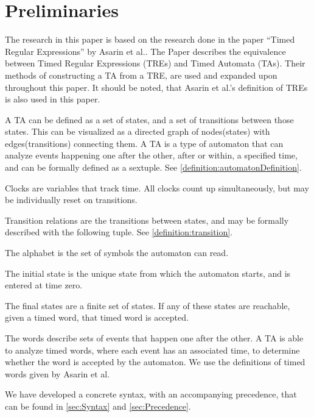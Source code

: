 \section{Preliminaries}\label{sec:preliminaries}






The research in this paper is based on the research done in the paper ``Timed Regular Expressions'' by Asarin et al.\cite{Eugene2001}. The Paper describes the equivalence between Timed Regular Expressions (TREs) and Timed Automata (TAs). Their methods of constructing a TA from a TRE, are used and expanded upon throughout this paper. It should be noted, that Asarin et al.'s definition of TREs is also used in this paper.

A TA can be defined as a set of states, and a set of transitions between those states. This can be visualized as a directed graph of nodes(states) with edges(transitions) connecting them.
A TA is a type of automaton that can analyze events happening one after the other, after or within, a specified time, and can be formally defined as a sextuple\cite{ALUR1994}. See \cref{definition:automatonDefinition}.


Clocks are variables that track time. All clocks count up simultaneously, but may be individually reset on transitions.

Transition relations are the transitions between states, and may be formally described with the following tuple. See \cref{definition:transition}.

The alphabet is the set of symbols the automaton can read.

The initial state is the unique state from which the automaton starts, and is entered at time zero.

The final states are a finite set of states. If any of these states are reachable, given a timed word, that timed word is accepted.

The words describe sets of events that happen one after the other. A TA is able to analyze timed words, where each event has an associated time, to determine whether the word is accepted by the automaton. We use the definitions of timed words given by Asarin et al. \cite{Eugene2001}



We have developed a concrete syntax, with an accompanying precedence, that can be found in \cref{sec:Syntax} and \cref{sec:Precedence}.
